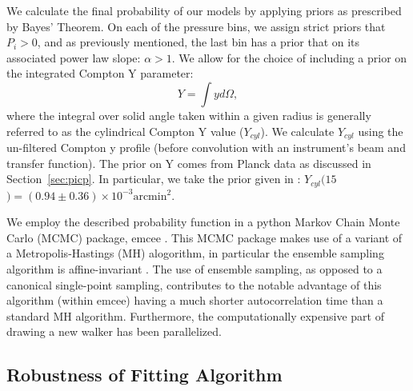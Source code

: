 \documentclass[twocolumn,traditabstract]{aa}
\begin{document}
We calculate the final probability of our models by applying priors as prescribed by Bayes' Theorem.
On each of the pressure bins, we assign strict priors that $P_i > 0$, and as previously mentioned, the last bin
has a prior that on its associated power law slope: $\alpha > 1$. We allow for the choice of including a prior
on the integrated Compton Y parameter:
\begin{equation}
  Y = \int y d\Omega,
  \label{eqn:integrated_y}
\end{equation}
where the integral over solid angle taken within a given radius is generally referred to as the cylindrical
Compton Y value ($Y_{cyl}$). We calculate $Y_{cyl}$ using the un-filtered Compton y profile (before convolution with
an instrument's beam and transfer function). The prior on Y comes
from Planck data \citep{planck2014} as discussed in Section~\ref{sec:picp}.
In particular, we take the prior given in \citet{adam2015}:
$Y_{cyl}(15$\amin$) = (0.94 \pm 0.36) \times 10^{-3} \text{arcmin}^2$.

We employ the described probability function in a python Markov Chain Monte Carlo (MCMC) package, emcee \citep{foreman2013}.
This MCMC package makes use of a variant of a Metropolis-Hastings (MH) alogorithm, in particular the ensemble sampling algorithm is
affine-invariant \citep{goodman2010}. The use of ensemble sampling, as opposed to a canonical single-point sampling, contributes
to the notable advantage of this algorithm (within emcee) having a much shorter autocorrelation time than a standard MH algorithm.
Furthermore, the computationally expensive part of drawing a new walker has been parallelized.


\subsection{Robustness of Fitting Algorithm}
\label{sec:robustness}
\end{document}
